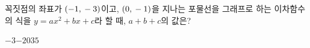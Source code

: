 꼭짓점의 좌표가 $(-1{,}\mkern3mu -3)$이고, $(0{,}\mkern3mu -1)$을 지나는 포물선을 그래프로 하는 이차함수의 식을 $y=ax^2+bx+c$라 할 때, $a+b+c$의 값은? 
\begin{choices32}{$-3$}{$-2$}{$0$}{$3$}{$5$}\end{choices32}
